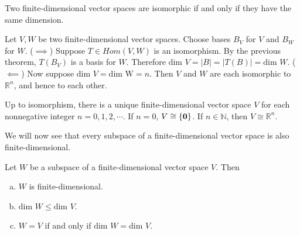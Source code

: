 \documentclass[12pt,letterpaper,reqno]{article}
\numberwithin{equation}{section}
\begin{document}
\begin{thm}
	Two finite-dimensional vector spaces are isomorphic if and only if they have the same dimension.
\end{thm}

\begin{pf}
	Let $V, W$ be two finite-dimensional vector spaces. Choose bases $B_V$ for $V$ and $B_W$ for $W$. ($\implies$) Suppose $T \in Hom(V,W)$ is an isomorphism. By the previous theorem, $T(B_V)$ is a basis for $W$. Therefore 
	$\text{dim }V=|B|=|T(B)|=\text{dim }W$. ($\impliedby$) Now suppose $\text{dim }V=\text{dim W}=n$. Then $V$ and $W$ are each isomorphic to $\mathbb{R}^n$, and hence to each other. 
\end{pf}

\begin{cor}
	Up to isomorphism, there is a unique finite-dimensional vector space $V$ for each nonnegative integer $n=0,1,2,\cdots$. If $n=0$, $V \cong \{{\bf 0}\}$. If $n \in \mathbb{N}$, then $V \cong \mathbb{R}^n$.
\end{cor}

We will now see that every subspace of a finite-dimensional vector space is also finite-dimensional.

\begin{thm}\label{thm:sub_fin_is_fin}
	Let $W$ be a subspace of a finite-dimensional vector space $V$. Then
	\begin{enumerate}[(a)]
		\item $W$ is finite-dimensional.
		\item $\text{dim }W \leq \text{dim }V$.
		\item $W=V$ if and only if $\text{dim }W=\text{dim }V$.
	\end{enumerate}
\end{thm}
\end{document}
